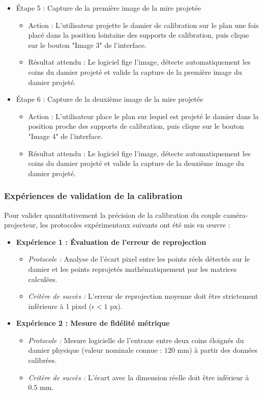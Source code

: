 \documentclass[10pt]{article} %
\begin{document}
\begin{itemize}
    \item{Étape 5 : Capture de la première image de la mire projetée}
    \begin{itemize}
    \item{Action : L'utilisateur projette le damier de calibration sur le plan une fois placé dans la position lointaine des supports de calibration, puis clique sur le bouton "Image 3" de l'interface.}
        \item{Résultat attendu : Le logiciel fige l'image, détecte automatiquement les coins du damier projeté et valide la capture de la première image du damier projeté.}
    \end{itemize}

    \item{Étape 6 : Capture de la deuxième image de la mire projetée}
    \begin{itemize}
        \item{Action : L'utilisateur place le plan sur lequel est projeté le damier dans la position proche des supports de calibration, puis clique sur le bouton "Image 4" de l'interface.}
        \item{Résultat attendu : Le logiciel fige l'image, détecte automatiquement les coins du damier projeté et valide la capture de la deuxième image du damier projeté.}
    \end{itemize}
\end{itemize}

\subsubsection*{Expériences de validation de la calibration}

Pour valider quantitativement la précision de la calibration du couple caméra-projecteur, les protocoles expérimentaux suivants ont été mis en œuvre :

\begin{itemize}
    \item \textbf{Expérience 1 : Évaluation de l'erreur de reprojection}
    \begin{itemize}
        \item \textit{Protocole :} Analyse de l'écart pixel entre les points réels détectés sur le damier et les points reprojetés mathématiquement par les matrices calculées.
        \item \textit{Critère de succès :} L'erreur de reprojection moyenne doit être strictement inférieure à 1 pixel ($\epsilon < 1 \text{ px}$).
    \end{itemize}

    \item \textbf{Expérience 2 : Mesure de fidélité métrique}
    \begin{itemize}
        \item \textit{Protocole :} Mesure logicielle de l'entraxe entre deux coins éloignés du damier physique (valeur nominale connue : $120 \text{ mm}$) à partir des données calibrées.
        \item \textit{Critère de succès :} L'écart avec la dimension réelle doit être inférieur à $0.5 \text{ mm}$.
    \end{itemize}
\end{itemize}
\end{document}
